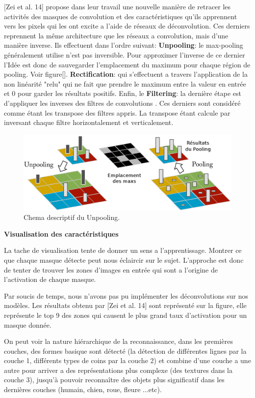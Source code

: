 [Zei et al. 14] propose dans leur travail une nouvelle manière de retracer les activités des masques de convolution et des caractéristiques qu'ils apprennent vers les pixels qui les ont excite a l'aide de réseaux de déconvolution. Ces derniers reprennent la même architecture que les réseaux a convolution, mais d'une manière inverse. Ils effectuent dans l'ordre suivant: \textbf{Unpooling}: le max-pooling généralement utilise n'est pas inversible. Pour approximer l'inverse de ce dernier l’Idée est donc de sauvegarder l'emplacement du maximum pour chaque région de pooling. Voir figure[]. \textbf{Rectification}: qui s'effectuent a travers l'application de la non linéarité "relu" qui ne fait que prendre le maximum entre la valeur en entrée et 0 pour garder les résultats positifs. Enfin, le \textbf{Filtering}: la dernière étape est d'appliquer les inverses des filtres de convolutions . Ces derniers sont considéré comme étant les transpose des filtres appris. La transpose étant calcule par inversant chaque filtre horizontalement et verticalement.


\begin{figure}[H]
	\centering
		\includegraphics[width=5in]{Figures/unpooling.png}
	\caption[Res]{Chema descriptif du Unpooling.}
	\label{fig:Electron}
\end{figure}

\textbf{Visualisation des caractéristiques}

La tache de visualisation tente de donner un sens a l'apprentissage. Montrer ce que chaque masque détecte peut nous éclaircir sur le sujet. L'approche est donc de tenter de trouver  les zones d'images en entrée qui sont a l'origine de l'activation de chaque masque. 

Par soucis de temps, nous n'avons pas pu implémenter les déconvolutions sur nos modèles. Les résultats obtenu par [Zei et al. 14] sont représenté sur la figure, elle représente le top 9 des zones qui causent le plus grand taux d'activation pour un masque donnée.

On peut voir la nature hiérarchique de la reconnaissance, dans les premières couches, des formes basique sont détecté (la détection de différentes lignes par la couche 1, différents types de coins par la couche 2) et combine d'une couche a une autre pour arriver a des représentations plus complexe (des textures dans la couche 3), jusqu’à pouvoir reconnaître des objets plus significatif dans les dernières couches (humain, chien, roue, fleure ...etc). 

